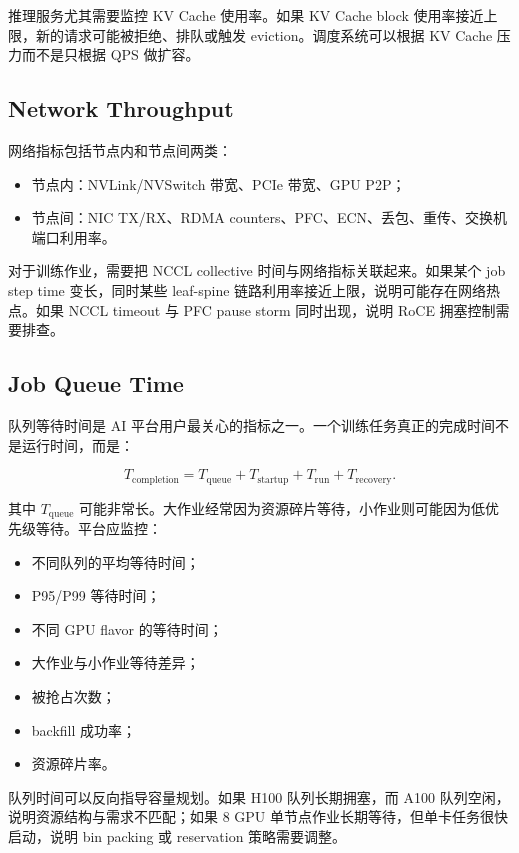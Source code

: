 推理服务尤其需要监控 KV Cache 使用率。如果 KV Cache block 使用率接近上限，新的请求可能被拒绝、排队或触发 eviction。调度系统可以根据 KV Cache 压力而不是只根据 QPS 做扩容。

\subsection{Network Throughput}
\label{subsec:network-throughput-monitoring}

网络指标包括节点内和节点间两类：

\begin{itemize}
  \item 节点内：NVLink/NVSwitch 带宽、PCIe 带宽、GPU P2P；
  \item 节点间：NIC TX/RX、RDMA counters、PFC、ECN、丢包、重传、交换机端口利用率。
\end{itemize}

对于训练作业，需要把 NCCL collective 时间与网络指标关联起来。如果某个 job step time 变长，同时某些 leaf-spine 链路利用率接近上限，说明可能存在网络热点。如果 NCCL timeout 与 PFC pause storm 同时出现，说明 RoCE 拥塞控制需要排查。

\subsection{Job Queue Time}
\label{subsec:job-queue-time}

队列等待时间是 AI 平台用户最关心的指标之一。一个训练任务真正的完成时间不是运行时间，而是：

\[
  T_{\text{completion}} = T_{\text{queue}} + T_{\text{startup}} + T_{\text{run}} + T_{\text{recovery}}.
\]

其中 $T_{\text{queue}}$ 可能非常长。大作业经常因为资源碎片等待，小作业则可能因为低优先级等待。平台应监控：

\begin{itemize}
  \item 不同队列的平均等待时间；
  \item P95/P99 等待时间；
  \item 不同 GPU flavor 的等待时间；
  \item 大作业与小作业等待差异；
  \item 被抢占次数；
  \item backfill 成功率；
  \item 资源碎片率。
\end{itemize}

队列时间可以反向指导容量规划。如果 H100 队列长期拥塞，而 A100 队列空闲，说明资源结构与需求不匹配；如果 8 GPU 单节点作业长期等待，但单卡任务很快启动，说明 bin packing 或 reservation 策略需要调整。

